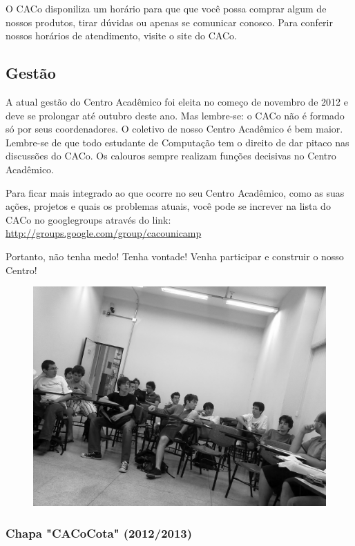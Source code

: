 O CACo disponiliza um horário para que que você possa comprar algum de nossos
produtos, tirar dúvidas ou apenas se comunicar conosco. Para conferir nossos
horários de atendimento, visite o site do CACo.


\subsection{Gestão}

A atual gestão do Centro Acadêmico foi eleita no começo de novembro de 2012 e deve
se prolongar até outubro deste ano. Mas lembre-se: o CACo não é formado só por
seus coordenadores. O coletivo de nosso Centro Acadêmico é bem maior. Lembre-se
de que todo estudante de Computação tem o direito de dar pitaco nas discussões
do CACo. Os calouros sempre realizam funções decisivas no Centro Acadêmico.

Para ficar mais integrado ao que ocorre no seu Centro Acadêmico, como as suas
ações, projetos e quais os problemas atuais, você pode se increver na lista do
CACo no googlegroups através do link:
\url{http://groups.google.com/group/cacounicamp}

Portanto, não tenha medo! Tenha vontade! Venha participar e construir o nosso
Centro!
\begin{figure}[t!]
    \centering
    \includegraphics[scale=0.47, keepaspectratio=true]{img/imgs/21-CACo/reuniao.jpg}
\end{figure}


\subsubsection{Chapa "CACoCota" (2012/2013)}

